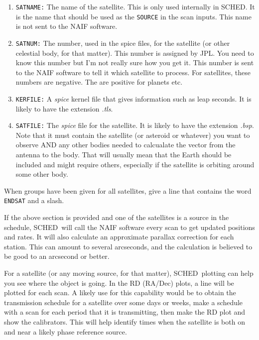 \documentclass{report}
\newcommand{\sched}{{\sc SCHED}}
\newcommand{\schedb}{{\sc SCHED~}}
\begin{document}
\begin{enumerate}

\item {\tt SATNAME:} The name of the satellite.  This is only used internally
in \sched.  It is the name that should be used as the {\tt SOURCE} in
the scan inputs.  This name is not sent to the NAIF software.

\item {\tt SATNUM:} The number, used in the spice files, for the satellite (or
other celestial body, for that matter).  This number is assigned by JPL.
You need to know this number but I'm not really sure how you get it.
This number is sent to the NAIF software to tell it which satellite to
process.  For satellites, these numbers are negative.  The are positive
for planets etc.

\item {\tt KERFILE:} A {\sl spice} kernel file that gives information such
as leap seconds.  It is likely to have the extension {\sl .tls}.

\item {\tt SATFILE:} The {\sl spice} file for the satellite.  It is likely
to have the extension {\sl .bsp}.  Note that it must contain the satellite
(or asteroid or whatever) you want to observe AND any other bodies needed
to calcualate the vector from the antenna to the body.  That will usually
mean that the Earth should be included and might require others, especially
if the satellite is orbiting around some other body.

\end{enumerate}

When groups have been given for all satellites, give a line that
contains the word {\tt ENDSAT} and a slash.

If the above section is provided and one of the satellites is a source
in the schedule, \schedb will call the NAIF software every scan to
get updated positions and rates.  It will also calculate an approximate
parallax correction for each station.  This can amount to several
arcseconds, and the calculation is believed to be good to an arcsecond
or better.

For a satellite (or any moving source, for that matter), \schedb plotting
can help you see where the object is going.  In the RD (RA/Dec) plots,
a line will be plotted for each scan.  A likely use for this capability
would be to obtain the transmission schedule for a satellite over some
days or weeks, make a schedule with a scan for each period that it
is transmitting, then make the RD plot and show the calibrators.  This
will help identify times when the satellite is both on and near
a likely phase reference source.
\end{document}
